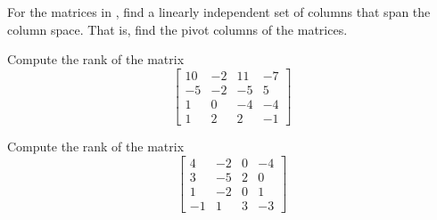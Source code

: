 \documentclass{ximera}
\begin{document}
\begin{exercise}%
    For the matrices in , find a linearly independent set of columns that span the column space. That is, find the pivot columns of the matrices.
\end{exercise}

\begin{exercise}
    Compute the rank of the matrix
    \begin{equation*}
        \begin{bmatrix}
            10 & -2 & 11 & -7 \\ 
            -5 & -2 & -5 & 5 \\
            1 & 0 & -4 & -4 \\
            1 & 2 & 2 & -1
        \end{bmatrix} 
    \end{equation*}
\end{exercise}

\begin{exercise}
    Compute the rank of the matrix
    \begin{equation*}
        \begin{bmatrix}
            4 & -2 & 0 & -4 \\
            3 & -5 & 2 & 0 \\
            1 & -2 & 0 & 1 \\
            -1 & 1 & 3 & -3
        \end{bmatrix} 
    \end{equation*}
\end{exercise}
\end{document}
